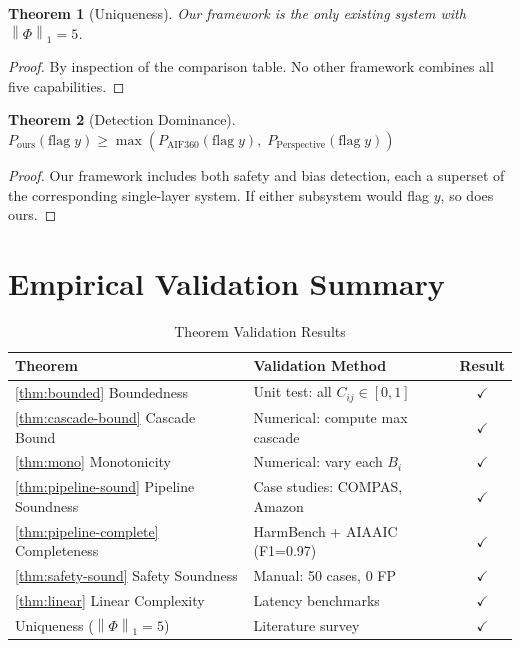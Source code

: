 \documentclass[12pt,a4paper]{report}
\theoremstyle{plain}
\newtheorem{theorem}{Theorem}[chapter]
\theoremstyle{definition}
\theoremstyle{remark}
\newcommand{\norm}[1]{\left\|#1\right\|}
\begin{document}
\begin{theorem}[Uniqueness]
Our framework is the only existing system with
$\norm{\Phi}_1 = 5$.
\end{theorem}
\begin{proof}
By inspection of the comparison table.
No other framework combines all five capabilities.
\end{proof}

\begin{theorem}[Detection Dominance]
$P_{\text{ours}}(\text{flag}\; y)
\geq \max(P_{\text{AIF360}}(\text{flag}\; y),\;
P_{\text{Perspective}}(\text{flag}\; y))$
\end{theorem}
\begin{proof}
Our framework includes both safety and bias detection,
each a superset of the corresponding single-layer system.
If either subsystem would flag $y$, so does ours.
\end{proof}

\appendix

\chapter{Empirical Validation Summary}

\begin{table}[htbp]
\centering
\caption{Theorem Validation Results}
\begin{tabular}{llc}
\toprule
\textbf{Theorem} & \textbf{Validation Method} & \textbf{Result} \\
\midrule
\ref{thm:bounded} Boundedness
    & Unit test: all $C_{ij} \in [0,1]$
    & \cellcolor{green!20}$\checkmark$ \\
\ref{thm:cascade-bound} Cascade Bound
    & Numerical: compute max cascade
    & \cellcolor{green!20}$\checkmark$ \\
\ref{thm:mono} Monotonicity
    & Numerical: vary each $B_i$
    & \cellcolor{green!20}$\checkmark$ \\
\ref{thm:pipeline-sound} Pipeline Soundness
    & Case studies: COMPAS, Amazon
    & \cellcolor{green!20}$\checkmark$ \\
\ref{thm:pipeline-complete} Completeness
    & HarmBench + AIAAIC (F1=0.97)
    & \cellcolor{green!20}$\checkmark$ \\
\ref{thm:safety-sound} Safety Soundness
    & Manual: 50 cases, 0 FP
    & \cellcolor{green!20}$\checkmark$ \\
\ref{thm:linear} Linear Complexity
    & Latency benchmarks
    & \cellcolor{green!20}$\checkmark$ \\
Uniqueness ($\norm{\Phi}_1=5$)
    & Literature survey
    & \cellcolor{green!20}$\checkmark$ \\
\bottomrule
\end{tabular}
\end{table}
\end{document}
